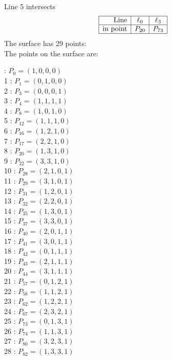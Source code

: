 \documentclass{article}
\begin{document}
{$$$$
Line 5 intersects 
$$
\begin{array}{|r*{2}{|c}|}
\hline
\mbox{Line}  & \ell_{0} & \ell_{3}\\
\hline
\mbox{in point}  & P_{20} & P_{73}\\
\hline
\end{array}
$$
The surface has 29 points:\\
The points on the surface are:\\
\begin{multicols}{3}
 : $P_{0}=( 1, 0, 0, 0 )$\\
1 : $P_{1}=( 0, 1, 0, 0 )$\\
2 : $P_{3}=( 0, 0, 0, 1 )$\\
3 : $P_{4}=( 1, 1, 1, 1 )$\\
4 : $P_{8}=( 1, 0, 1, 0 )$\\
5 : $P_{12}=( 1, 1, 1, 0 )$\\
6 : $P_{16}=( 1, 2, 1, 0 )$\\
7 : $P_{17}=( 2, 2, 1, 0 )$\\
8 : $P_{20}=( 1, 3, 1, 0 )$\\
9 : $P_{22}=( 3, 3, 1, 0 )$\\
10 : $P_{28}=( 2, 1, 0, 1 )$\\
11 : $P_{29}=( 3, 1, 0, 1 )$\\
12 : $P_{31}=( 1, 2, 0, 1 )$\\
13 : $P_{32}=( 2, 2, 0, 1 )$\\
14 : $P_{35}=( 1, 3, 0, 1 )$\\
15 : $P_{37}=( 3, 3, 0, 1 )$\\
16 : $P_{40}=( 2, 0, 1, 1 )$\\
17 : $P_{41}=( 3, 0, 1, 1 )$\\
18 : $P_{42}=( 0, 1, 1, 1 )$\\
19 : $P_{43}=( 2, 1, 1, 1 )$\\
20 : $P_{44}=( 3, 1, 1, 1 )$\\
21 : $P_{57}=( 0, 1, 2, 1 )$\\
22 : $P_{58}=( 1, 1, 2, 1 )$\\
23 : $P_{62}=( 1, 2, 2, 1 )$\\
24 : $P_{67}=( 2, 3, 2, 1 )$\\
25 : $P_{73}=( 0, 1, 3, 1 )$\\
26 : $P_{74}=( 1, 1, 3, 1 )$\\
27 : $P_{80}=( 3, 2, 3, 1 )$\\
28 : $P_{82}=( 1, 3, 3, 1 )$\\
\end{multicols}


}
\end{document}
